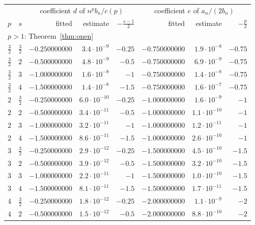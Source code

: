 \begin{table}[ht]
\centering
\small
\begin{tabular}{rrrrrrrr}
\toprule
 & & \multicolumn{3}{c}{coefficient $d$ of $n^pb_n/c(p)$} & \multicolumn{3}{c}{coefficient $e$ of $a_n/(2b_n)$}\\
\cmidrule(lr){3-5}\cmidrule(lr){6-8}
$p$ & $s$ & fitted & estimate & $-\frac{s-1}2$ & fitted & estimate & $-\frac p2$\\
\midrule
\multicolumn{8}{l}{$p>1$: Theorem~\ref{thm:onen}}\\
$\frac32$ & $\frac32$ & $-0.250000000$ & $3.4\cdot10^{-9}$ & $-0.25$ & $-0.750000000$ & $1.9\cdot10^{-8}$ & $-0.75$\\
$\frac32$ & $2$ & $-0.500000000$ & $4.8\cdot10^{-9}$ & $-0.5$ & $-0.750000000$ & $6.9\cdot10^{-9}$ & $-0.75$\\
$\frac32$ & $3$ & $-1.000000000$ & $1.6\cdot10^{-8}$ & $-1$ & $-0.750000000$ & $1.4\cdot10^{-8}$ & $-0.75$\\
$\frac32$ & $4$ & $-1.500000000$ & $1.4\cdot10^{-8}$ & $-1.5$ & $-0.750000000$ & $1.6\cdot10^{-7}$ & $-0.75$\\
$2$ & $\frac32$ & $-0.250000000$ & $6.0\cdot10^{-10}$ & $-0.25$ & $-1.000000000$ & $1.6\cdot10^{-9}$ & $-1$\\
$2$ & $2$ & $-0.500000000$ & $3.4\cdot10^{-11}$ & $-0.5$ & $-1.000000000$ & $1.1\cdot10^{-10}$ & $-1$\\
$2$ & $3$ & $-1.000000000$ & $3.2\cdot10^{-11}$ & $-1$ & $-1.000000000$ & $1.2\cdot10^{-11}$ & $-1$\\
$2$ & $4$ & $-1.500000000$ & $8.6\cdot10^{-11}$ & $-1.5$ & $-1.000000000$ & $2.6\cdot10^{-10}$ & $-1$\\
$3$ & $\frac32$ & $-0.250000000$ & $2.9\cdot10^{-12}$ & $-0.25$ & $-1.500000000$ & $4.5\cdot10^{-10}$ & $-1.5$\\
$3$ & $2$ & $-0.500000000$ & $3.9\cdot10^{-12}$ & $-0.5$ & $-1.500000000$ & $3.2\cdot10^{-10}$ & $-1.5$\\
$3$ & $3$ & $-1.000000000$ & $2.2\cdot10^{-11}$ & $-1$ & $-1.500000000$ & $1.0\cdot10^{-10}$ & $-1.5$\\
$3$ & $4$ & $-1.500000000$ & $8.1\cdot10^{-11}$ & $-1.5$ & $-1.500000000$ & $1.7\cdot10^{-11}$ & $-1.5$\\
$4$ & $\frac32$ & $-0.250000000$ & $1.8\cdot10^{-12}$ & $-0.25$ & $-2.000000000$ & $1.1\cdot10^{-9}$ & $-2$\\
$4$ & $2$ & $-0.500000000$ & $1.5\cdot10^{-12}$ & $-0.5$ & $-2.000000000$ & $8.8\cdot10^{-10}$ & $-2$\\

\end{tabular}
\end{table}
